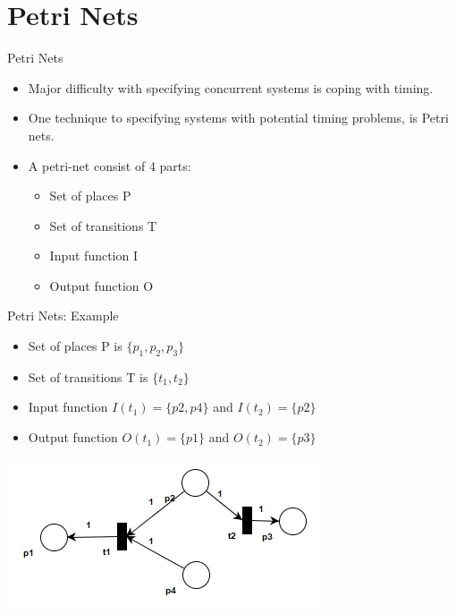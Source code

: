 \documentclass{beamer}
\begin{document}
	\section{Petri Nets}
	\begin{frame}{Petri Nets}
    	\begin{itemize}
            \item Major difficulty with specifying concurrent systems is coping with timing.
            \item One technique to specifying systems with potential timing problems, is Petri nets.
            \item A petri-net consist of 4 parts:
            \begin{itemize}
                \item Set of places P
                \item Set of transitions T
                \item Input function I
                \item Output function O
            \end{itemize}
	    \end{itemize}
	\end{frame}
	\begin{frame}{Petri Nets: Example}
    	\begin{itemize}
            \item Set of places P is $\{p_1, p_2, p_3\}$
            \item Set of transitions T is $\{t_1, t_2\}$
            \item Input function $I(t_1) = \{p2, p4\}$ and $I(t_2) = \{p2\}$
            \item Output function $O(t_1) = \{p1\}$ and $O(t_2) = \{p3\}$
	    \end{itemize}
	    \includegraphics[scale=0.7]{img/03_petrinet_simple.png}
	\end{frame}
\end{document}
